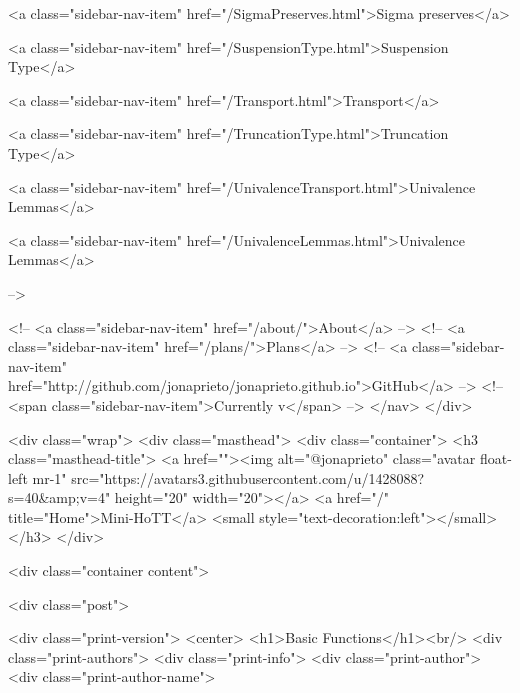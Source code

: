       
        
          <a class="sidebar-nav-item" href="/SigmaPreserves.html">Sigma preserves</a>
        
      
    
      
        
          <a class="sidebar-nav-item" href="/SuspensionType.html">Suspension Type</a>
        
      
    
      
        
          <a class="sidebar-nav-item" href="/Transport.html">Transport</a>
        
      
    
      
        
          <a class="sidebar-nav-item" href="/TruncationType.html">Truncation Type</a>
        
      
    
      
        
          <a class="sidebar-nav-item" href="/UnivalenceTransport.html">Univalence Lemmas</a>
        
      
    
      
        
          <a class="sidebar-nav-item" href="/UnivalenceLemmas.html">Univalence Lemmas</a>
        
      
     -->

    <!-- <a class="sidebar-nav-item" href="/about/">About</a> -->
    <!-- <a class="sidebar-nav-item" href="/plans/">Plans</a> -->
    <!-- <a class="sidebar-nav-item" href="http://github.com/jonaprieto/jonaprieto.github.io">GitHub</a> -->
    <!-- <span class="sidebar-nav-item">Currently v</span> -->
  </nav>
</div>

    <div class="wrap">
      <div class="masthead">
        <div class="container">
          <h3 class="masthead-title">
            <a href=""><img alt="@jonaprieto" class="avatar float-left mr-1" src="https://avatars3.githubusercontent.com/u/1428088?s=40&amp;v=4" height="20" width="20"></a>
            <a href="/" title="Home">Mini-HoTT</a>
            <small style="text-decoration:left"></small>
          </h3>
        </div>
      
      <div class="container content">
        







<div class="post">

  <div class="print-version">
    <center>
      <h1>Basic Functions</h1><br/>
        <div class="print-authors">
          <div class="print-info">
            <div class="print-author">
              <div class="print-author-name">
                

